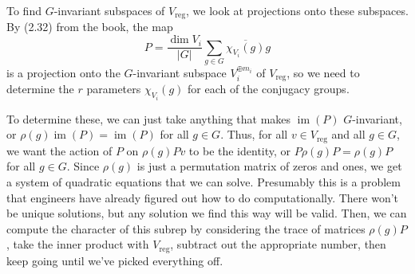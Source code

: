 \documentclass{article}
\newcommand{\conj}{\overline}
\DeclareMathOperator{\im}{im}
\begin{document}
To find $G$-invariant subspaces of $V_\text{reg}$, we look at projections onto these subspaces. By (2.32) from the book, the map 
\[P=\frac{\dim V_i}{|G|}\sum_{g\in G}\conj{\chi_{V_i}(g)}g\]
is a projection onto the $G$-invariant subspace $V_i^{\oplus m_i}$ of $V_\text{reg}$, so we need to determine the $r$ parameters $\chi_{V_i}(g)$ for each of the conjugacy groups. 

To determine these, we can just take anything that makes $\im(P)$ $G$-invariant, or $\rho(g)\im(P)=\im(P)$ for all $g\in G$. Thus, for all $v\in V_\text{reg}$ and all $g\in G$, we want the action of $P$ on $\rho(g)Pv$ to be the identity, or $P\rho(g)P=\rho(g)P$ for all $g\in G$. Since $\rho(g)$ is just a permutation matrix of zeros and ones, we get a system of quadratic equations that we can solve. Presumably this is a problem that engineers have already figured out how to do computationally. There won't be unique solutions, but any solution we find this way will be valid. Then, we can compute the character of this subrep by considering the trace of matrices $\rho(g)P$, take the inner product with $V_\text{reg}$, subtract out the appropriate number, then keep going until we've picked everything off.
\end{document}
